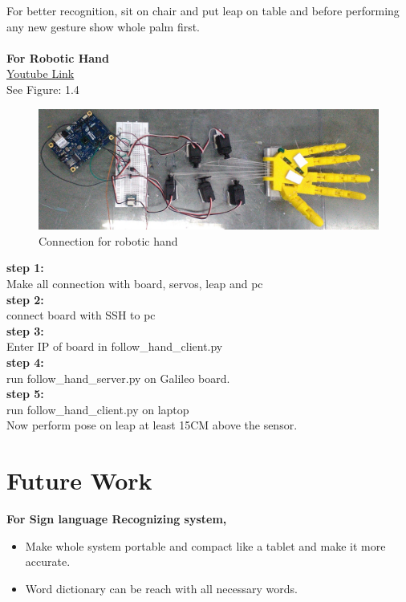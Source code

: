 \documentclass[a4paper,12pt,oneside]{book}
\begin{document}
For better recognition, sit on chair and put leap on table and before performing any new gesture show whole palm first.\\
\vspace{1cm}\\
\textbf{For Robotic Hand}\\
\href{https://youtu.be/TIkOeNoe4vE}{Youtube Link}\\
See Figure: 1.4\\

\begin{figure}
  \includegraphics[width=\linewidth]{4.jpg}
  \caption{Connection for robotic hand}
\end{figure}
\textbf{step 1:}\\
Make all connection with board, servos, leap and pc\\
\textbf{step 2:}\\
connect board with SSH to pc\\
\textbf{step 3:}\\
Enter IP of board in follow\_hand\_client.py\\
\textbf{step 4:}\\
run follow\_hand\_server.py on Galileo board.\\
\textbf{step 5:}\\
run follow\_hand\_client.py on laptop\\

Now perform pose on leap at least 15CM above the sensor.


\section{Future Work}
\textbf{For Sign language Recognizing system,}\\
\begin{itemize}
\item Make whole system portable and compact like a tablet and make it more accurate.
\item Word dictionary can be reach with all necessary words.
\end{itemize}
\end{document}

